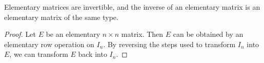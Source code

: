 \begin{theorem}\label{Theorem 3.2}
    Elementary matrices are invertible, and the inverse of an elementary matrix is an elementary matrix of the same type.
\end{theorem}
\begin{proof}
Let \( E  \) be an elementary \( n \times n  \) matrix. Then \( E  \) can be obtained by an elementary row operation on \( {I}_{n} \). By reversing the steps used to transform \( {I}_{n}  \) into \( E  \), we can transform \( E  \) back into \( {I}_{n} \).
\end{proof}
